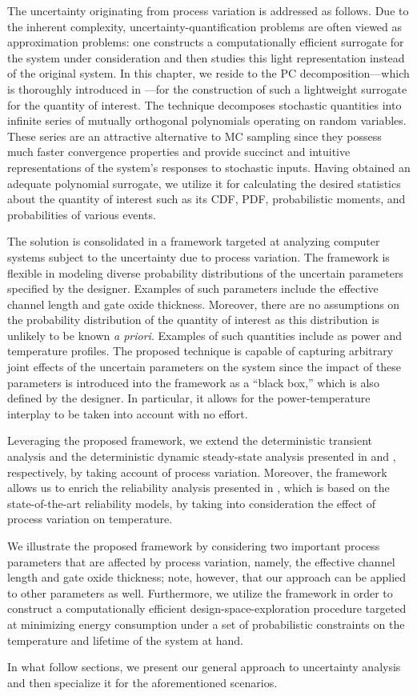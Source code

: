 The uncertainty originating from process variation is addressed as follows. Due
to the inherent complexity, uncertainty-quantification problems are often viewed
as approximation problems: one constructs a computationally efficient surrogate
for the system under consideration and then studies this light representation
instead of the original system. In this chapter, we reside to the \ac{PC}
decomposition---which is thoroughly introduced in ---for
the construction of such a lightweight surrogate for the quantity of interest.
The technique decomposes stochastic quantities into infinite series of mutually
orthogonal polynomials operating on random variables. These series are an
attractive alternative to \ac{MC} sampling since they possess much faster
convergence properties and provide succinct and intuitive representations of the
system's responses to stochastic inputs. Having obtained an adequate polynomial
surrogate, we utilize it for calculating the desired statistics about the
quantity of interest such as its \ac{CDF}, \ac{PDF}, probabilistic moments, and
probabilities of various events.

The solution is consolidated in a framework targeted at analyzing computer
systems subject to the uncertainty due to process variation. The framework is
flexible in modeling diverse probability distributions of the uncertain
parameters specified by the designer. Examples of such parameters include the
effective channel length and gate oxide thickness. Moreover, there are no
assumptions on the probability distribution of the quantity of interest as this
distribution is unlikely to be known \emph{a priori}. Examples of such
quantities include as power and temperature profiles. The proposed technique is
capable of capturing arbitrary joint effects of the uncertain parameters on the
system since the impact of these parameters is introduced into the framework as
a ``black box,'' which is also defined by the designer. In particular, it allows
for the power-temperature interplay to be taken into account with no effort.

Leveraging the proposed framework, we extend the deterministic transient
analysis and the deterministic dynamic steady-state analysis presented in
 and ,
respectively, by taking account of process variation. Moreover, the framework
allows us to enrich the reliability analysis presented in
, which is based on the state-of-the-art reliability
models, by taking into consideration the effect of process variation on
temperature.

We illustrate the proposed framework by considering two important process
parameters that are affected by process variation, namely, the effective channel
length and gate oxide thickness; note, however, that our approach can be applied
to other parameters as well. Furthermore, we utilize the framework in order to
construct a computationally efficient design-space-exploration procedure
targeted at minimizing energy consumption under a set of probabilistic
constraints on the temperature and lifetime of the system at hand.

In what follow sections, we present our general approach to uncertainty analysis
and then specialize it for the aforementioned scenarios.
